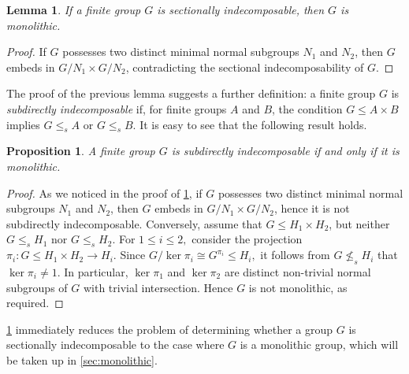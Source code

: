 \documentclass[10pt,a4paper]{amsart}
\newtheorem{lemma}[thm]{Lemma}
\newtheorem{proposition}[thm]{Proposition}
\begin{document}
\begin{lemma}\label{l:monolithic}
	If a finite group $G$ is sectionally indecomposable, then $G$ is monolithic.
\end{lemma}

\begin{proof}
	If $G$ possesses two distinct minimal normal subgroups $N_1$ and $N_2$, then $G$ embeds in $G/N_1 \times G/N_2$, contradicting the sectional indecomposability of $G$.
\end{proof}

The proof of the previous lemma suggests a further definition: a finite group $G$ is \emph{subdirectly indecomposable} if, for finite groups $A$ and $B$, the condition $G \leq A \times B$ implies $G \leq_s A$ or $G \leq_s B$. It is easy to see that the following result holds.

\begin{proposition}\label{p:monsub} A finite group $G$ is subdirectly  indecomposable if and only if it is  monolithic. 
\end{proposition}
\begin{proof}
As we noticed in the proof of \cref{l:monolithic}, if $G$ possesses two distinct minimal normal subgroups $N_1$ and $N_2$, then $G$ embeds in $G/N_1 \times G/N_2$, hence it is not subdirectly indecomposable. Conversely, assume that $G\leq H_1\times H_2$, but neither $G\leq_s H_1$ nor $G\leq_s H_2.$ For $1\leq i\leq 2,$ consider the projection $\pi_i\colon G\leq H_1\times H_2\to H_i.$ Since $G/\ker \pi_i\cong G^{\pi_i}\leq H_i,$ it follows from $G\not\leq_s H_i$ that $\ker \pi_i\neq 1$. In particular, $\ker \pi_1$ and $\ker \pi_2$ are distinct non-trivial normal subgroups of $G$ with trivial intersection. Hence $G$ is not monolithic, as required.
\end{proof}

\cref{l:monolithic} immediately reduces the problem of determining whether a group $G$ is sectionally indecomposable to the case where $G$ is a monolithic group, which will be taken up in \cref{sec:monolithic}.
\end{document}
